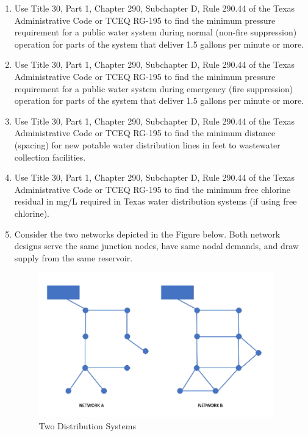 \documentclass[12pt]{article}
\begin{document}
\begin{enumerate}
\item Use Title 30, Part 1, Chapter 290, Subchapter D, Rule 290.44 of the Texas Administrative Code or TCEQ RG-195 to find the minimum pressure requirement for a public water system during normal (non-fire suppression) operation for parts of the system that deliver 1.5 gallons per minute or more.\\
\clearpage
\item Use Title 30, Part 1, Chapter 290, Subchapter D, Rule 290.44 of the Texas Administrative Code or TCEQ RG-195 to find the minimum pressure requirement for a public water system during emergency (fire suppression) operation for parts of the system that deliver 1.5 gallons per minute or more.\\
\item Use Title 30, Part 1, Chapter 290, Subchapter D, Rule 290.44 of the Texas Administrative Code or TCEQ RG-195 to find the minimum distance (spacing) for new potable water distribution lines in feet to wastewater collection facilities.\\
\item Use Title 30, Part 1, Chapter 290, Subchapter D, Rule 290.44 of the Texas Administrative Code or TCEQ RG-195 to find the minimum free chlorine residual in mg/L required in Texas water distribution systems (if using free chlorine).\\
\item Consider the two networks depicted in the Figure below. Both network designs serve the same junction nodes, have same nodal demands, and draw supply from the same reservoir.

\begin{figure}[h!] %
   \centering
   \includegraphics[width=4in]{Distribution.png} 
   \caption{Two Distribution Systems}
   \label{fig:placeholder0}
\end{figure}


\end{enumerate}
\end{document}
